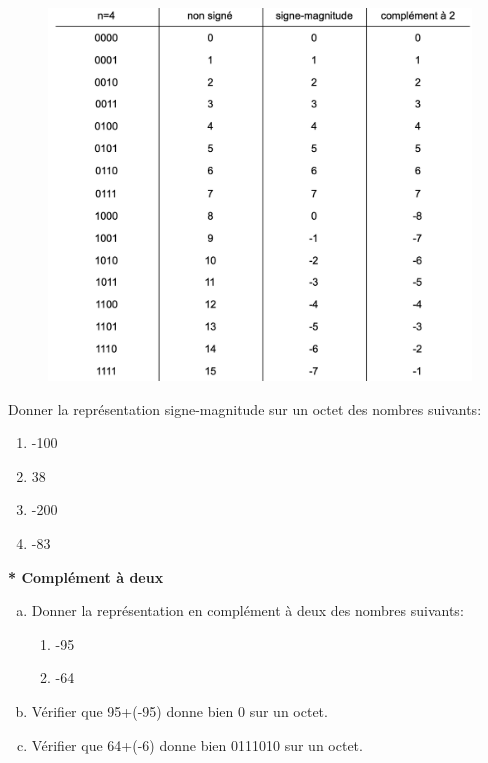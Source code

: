 \documentclass[11pt, a4paper]{book}
\begin{document}
\begin{figure}[h!]
\begin{center}
\includegraphics[scale=.45]{images/tablerepresentation}
\end{center}
\end{figure}




\begin{exercice}
Donner la représentation signe-magnitude sur un octet des nombres suivants:
\begin{multicols}{2}
\begin{enumerate}
 	\item -100
 	\item 38
 	\item -200
 	\item -83
\end{enumerate}
\end{multicols}
\end{exercice}


\begin{exercice}\textbf{* Complément à deux }
\begin{enumerate}[a)]
\item Donner la représentation en complément à deux des nombres suivants:

\begin{enumerate}
\item -95
\item -64
\end{enumerate}

\item Vérifier que 95+(-95) donne bien 0 sur un octet.
\item Vérifier que 64+(-6) donne bien 0111010 sur un octet.
\end{enumerate}
\end{exercice}
\end{document}
